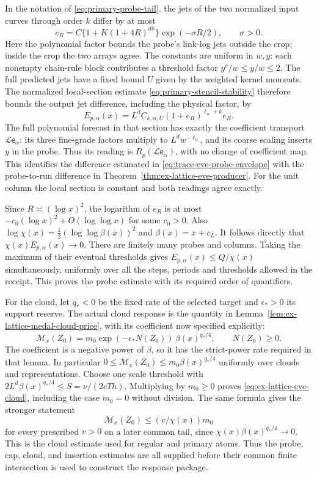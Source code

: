 In the notation of \eqref{eq:primary-probe-tail}, the jets of the
two normalized input curves through order $k$ differ by at most
\[
 e_R=C\{1+K(1+4R)^{dk}\}\exp(-\sigma R/2),\qquad \sigma>0.
\]
Here the polynomial factor bounds the probe's link-log jets outside
the crop; inside the crop the two arrays agree. The constants are
uniform in $w,y$: each nonempty chain-rule block contributes a
threshold factor $y^r/w\le y/w\le2$.
The full predicted jets have a fixed bound $U$ given by the weighted
kernel moments. The normalized local-section estimate
\eqref{eq:primary-stencil-stability} therefore bounds the output
jet difference, including the physical factor, by
\begin{equation}\label{eq:trace-eve-probe-envelope}
 E_{p,\alpha}(x)
   =L^d C_{k,\alpha,U}(1+e_R)^{\ell_\alpha+k}e_R.
\end{equation}
The full polynomial forecast in that section has exactly the
coefficient transport $\mathcal L\mathsf e_\alpha$: its three
fine-grade factors multiply to $L^d w^{-\ell_\alpha}$, and its
coarse scaling inserts $y$ in the probe. Thus its reading is
$R_p(\mathcal L\mathsf e_\alpha)$, with no change of coefficient
map. This identifies the difference estimated in
\eqref{eq:trace-eve-probe-envelope} with the probe-to-run difference
in Theorem~\ref{thm:ex-lattice-eve-producer}. For the unit column the
local section is constant and both readings agree exactly.

Since $R\asymp(\log x)^2$, the logarithm of $e_R$ is at most
$-c_0(\log x)^2+O(\log\log x)$ for some $c_0>0$.
Also $\log\chi(x)=\tfrac12(\log\log\beta(x))^2$ and
$\beta(x)=x+c_L$. It follows directly that
$\chi(x)E_{p,\alpha}(x)\to0$. There are finitely many probes
and columns. Taking the maximum of their eventual thresholds gives
$E_{p,\alpha}(x)\le Q/\chi(x)$ simultaneously, uniformly over
all the steps, periods and thresholds allowed in the receipt.
This proves the probe estimate with its required order of quantifiers.

For the cloud, let $q_*<0$ be the fixed rate of the selected target
and $\epsilon_*>0$ its support reserve. The actual cloud response
is the quantity in Lemma~\ref{lem:ex-lattice-medal-cloud-price}, with
its coefficient now specified explicitly:
\begin{equation}\label{eq:trace-eve-cloud-formula}
 \mathcal M_x(Z_0)
 =m_0\exp(-\epsilon_*N(Z_0))\,\beta(x)^{q_*/4},
 \qquad N(Z_0)\ge0.
\end{equation}
The coefficient is a negative power of $\beta$, so it has the
strict-power rate required in that lemma. In particular
$0\le\mathcal M_x(Z_0)\le m_0\beta(x)^{q_*/4}$ uniformly
over clouds and representations. Choose one scale threshold with
$2L^d\beta(x)^{q_*/4}\le S=\nu/(2cTh)$.
Multiplying by $m_0\ge0$ proves \eqref{eq:ex-lattice-eve-cloud}, including the case $m_0=0$
without division. The same formula gives the stronger statement
\[
 \mathcal M_x(Z_0)\le (v/\chi(x))m_0
\]
for every prescribed $v>0$ on a later common tail, since
$\chi(x)\beta(x)^{q_*/4}\to0$. This is the cloud estimate
used for regular and primary atoms. Thus the probe, cap, cloud,
and insertion estimates are all supplied before their common
finite intersection is used to construct the response package.
